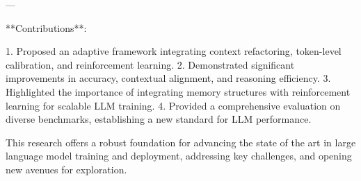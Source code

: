 ---

**Contributions**:  

1. Proposed an adaptive framework integrating context refactoring, token-level calibration, and reinforcement learning.  
2. Demonstrated significant improvements in accuracy, contextual alignment, and reasoning efficiency.  
3. Highlighted the importance of integrating memory structures with reinforcement learning for scalable LLM training.  
4. Provided a comprehensive evaluation on diverse benchmarks, establishing a new standard for LLM performance.  

This research offers a robust foundation for advancing the state of the art in large language model training and deployment, addressing key challenges, and opening new avenues for exploration.